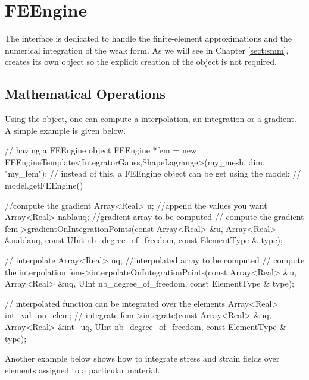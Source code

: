 \chapter{FEEngine}
\label{chap:feengine}
The  interface is dedicated to handle the
finite-element approximations and the numerical integration of the
weak form. As we will see in Chapter \ref{sect:smm}, 
creates its own  object so the explicit creation of the
object is not required.

\section{Mathematical Operations\label{sect:fe:mathop}}
Using the  object, one can compute a interpolation, an
integration or a gradient. A simple example is given below.

\begin{cpp}
// having a FEEngine object
FEEngine *fem = new FEEngineTemplate<IntegratorGauss,ShapeLagrange>(my_mesh, 
                                                                    dim, 
                                                                    "my_fem");
// instead of this, a FEEngine object can be get using the model: 
// model.getFEEngine()

//compute the gradient
Array<Real> u; //append the values you want
Array<Real> nablauq; //gradient array to be computed
// compute the gradient
fem->gradientOnIntegrationPoints(const Array<Real> &u,
				 Array<Real> &nablauq,
				 const UInt nb_degree_of_freedom,
				 const ElementType & type);

// interpolate
Array<Real> uq; //interpolated array to be computed
// compute the interpolation
fem->interpolateOnIntegrationPoints(const Array<Real> &u,
                                    Array<Real> &uq,
                                    UInt nb_degree_of_freedom,
                                    const ElementType & type);

// interpolated function can be integrated over the elements
Array<Real> int_val_on_elem;
// integrate
fem->integrate(const Array<Real> &uq, 
               Array<Real> &int_uq, 
               UInt nb_degree_of_freedom,
               const ElementType & type);
\end{cpp}

Another example below shows how to integrate stress and strain fields
over elements assigned to a particular material.

